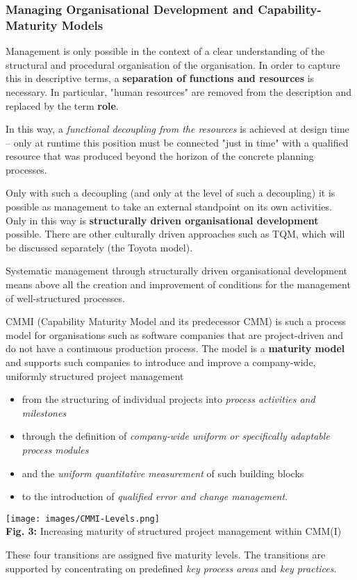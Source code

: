 \documentclass[11pt,a4paper]{article}
\begin{document}
\subsubsection*{Managing Organisational Development and Capability-Maturity
  Models} 

Management is only possible in the context of a clear understanding of the
structural and procedural organisation of the organisation.  In order to
capture this in descriptive terms, a \textbf{separation of functions and
  resources} is necessary. In particular, "human resources" are removed from
the description and replaced by the term \textbf{role}.

In this way, a \emph{functional decoupling from the resources} is achieved at
design time -- only at runtime this position must be connected "just in time"
with a qualified resource that was produced beyond the horizon of the concrete
planning processes.

Only with such a decoupling (and only at the level of such a decoupling) it is
possible as management to take an external standpoint on its own activities.
Only in this way is \textbf{structurally driven organisational development}
possible. There are other culturally driven approaches such as TQM, which will
be discussed separately (the Toyota model).

Systematic management through structurally driven organisational development
means above all the creation and improvement of conditions for the management
of well-structured processes.

CMMI (Capability Maturity Model and its predecessor CMM) is such a process
model for organisations such as software companies that are project-driven and
do not have a continuous production process. The model is a \textbf{maturity
  model} and supports such companies to introduce and improve a company-wide,
uniformly structured project management
\begin{itemize} 
\item from the structuring of individual projects into \emph{process
  activities and milestones}
\item through the definition of \emph{company-wide uniform or specifically
  adaptable process modules}
\item and the \emph{uniform quantitative measurement} of such building blocks
\item to the introduction of \emph{qualified error and change management}.
\end{itemize}
\begin{center}
  \texttt{[image: images/CMMI-Levels.png]}\\
  \textbf{Fig. 3:} Increasing maturity of structured project management within
  CMM(I)
\end{center}
These four transitions are assigned five maturity levels. The transitions are
supported by concentrating on predefined \emph{key process areas} and
\emph{key practices}.
\end{document}

